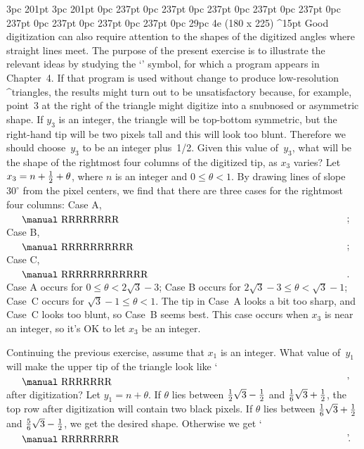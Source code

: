 \ddangerexercise
{}
3pc 201pt
3pc 201pt
0pc 237pt
0pc 237pt
0pc 237pt
0pc 237pt
0pc 237pt
0pc 237pt
0pc 237pt
0pc 237pt
0pc 237pt
0pc 29pc
\rightfig 4e ({180\apspix} x {225\apspix}) ^15pt
Good digitization can also require attention to the shapes of the
digitized angles where straight lines meet. The purpose of
the present exercise is to illustrate the relevant ideas by
studying the `' symbol, for which a program
appears in Chapter~4. If that program is used without change to produce
low-resolution ^{triangle}s, the results might turn out to be unsatisfactory
because, for example, point~3 at the right of the triangle
might digitize into a snubnosed or asymmetric shape.
If $y_3$ is an integer, the triangle will be top-bottom symmetric, but
the right-hand tip will be two pixels tall and this will look too blunt.
Therefore we should choose~$y_3$ to be an integer plus~1/2.
Given this value of~$y_3$, what will be the shape of the rightmost
four columns of the digitized tip, as $x_3$ varies?
\answer Let $x_3=n+{1\over2}+\theta$, where $n$ is an integer and
$0\le\theta<1$. By drawing lines of slope~$30^\circ$ from the pixel
centers, we find that there are three cases for the rightmost four
columns:
\begindisplay
Case A,
$\vcenter{\vbox{\offinterlineskip\manual
    \hbox{RR}\hbox{RRRR}\hbox{RR}\kern1pt}}$;\qquad
Case B,
$\vcenter{\vbox{\offinterlineskip\manual
    \hbox{R}\hbox{RR}\hbox{RRRR}\hbox{RR}\hbox{R}\kern1pt}}$;\qquad
Case C,
$\vcenter{\vbox{\offinterlineskip\manual
    \hbox{R}\hbox{RRR}\hbox{RRRR}\hbox{RRR}\hbox{R}\kern1pt}}$.
\enddisplay
Case A occurs for $0\le\theta<2\sqrt3-3$; Case B occurs for
$2\sqrt3-3\le\theta<\sqrt3-1$; Case~C occurs for
$\sqrt3-1\le\theta<1$. The tip in Case~A looks a bit too sharp,
and Case~C looks too blunt, so Case~B seems best. This case occurs
when $x_3$ is near an integer, so it's OK to let $x_3$ be an integer.

\ddangerexercise Continuing the previous exercise, assume that $x_1$
is an integer. What value of~$y_1$ will make the upper tip of the
triangle look like
`\thinspace$\vcenter{\vbox{\offinterlineskip\manual
    \hbox{R}\hbox{RR}\hbox{RRRR}\kern1pt}}$' after digitization?
\answer Let $y_1=n+\theta$. If $\theta$ lies between
${1\over2}\sqrt3-{1\over2}$ and ${1\over6}\sqrt3+{1\over2}$,
the top row after digitization will contain two black pixels.
If $\theta$ lies between ${1\over6}\sqrt3+{1\over2}$ and
${5\over6}\sqrt3-{1\over2}$, we get the desired shape. Otherwise
we get `\thinspace$\vcenter{\vbox{\offinterlineskip\manual
    \hbox{R}\hbox{RRR}\hbox{RRRR}\kern1pt}}$'.

